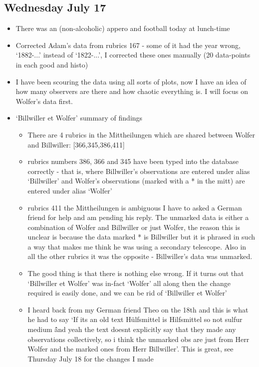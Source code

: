 \documentclass[12pt]{article}
\begin{document}
\subsection{Wednesday July 17}
\begin{itemize}
    \item There was an (non-alcoholic) appero and football today at lunch-time
    \item Corrected Adam's data from rubrics 167 - some of it had the year wrong, `1882-...' instead of `1822-...', I corrected these ones manually (20 data-points in each good and histo)
    \item I have been scouring the data using all sorts of plots, now I have an idea of how many observers are there and how chaotic everything is. I will focus on Wolfer's data first.
    \item `Billwiller et Wolfer' summary of findings
    \begin{itemize}
        \item There are 4 rubrics in the Mittheilungen which are shared between Wolfer and Billwiller: [366,345,386,411]
        \item rubrics numbers 386, 366 and 345 have been typed into the database correctly - that is, where Billwiller's observations are entered under alias `Billwiller' and Wolfer's observations (marked with a * in the mitt) are entered under alias `Wolfer'
        \item rubrics 411 the Mittheilungen is ambiguous I have to asked a German friend for help and am pending his reply. The unmarked data is either a combination of Wolfer and Billwiller or just Wolfer, the reason this is unclear is because the data marked * is Billwiller but it is phrased in such a way that makes me think he was using a secondary telescope. Also in all the other rubrics it was the opposite - Billwiller's data was unmarked.
        \item The good thing is that there is nothing else wrong. If it turns out that `Billwiller et Wolfer' was in-fact `Wolfer' all along then the change required is easily done, and we can be rid of `Billwiller et Wolfer'
        \item I heard back from my German friend Theo on the 18th and this is what he had to say `If its an old text Hülfsmittel is Hilfsmittel so not sulfur medium \^\^ and yeah the text doesnt explicitly say that they made any observations collectively, so i think the unmarked obs are just from Herr Wolfer and the marked ones from Herr Billwiller'. This is great, see Thursday July 18 for the changes I made

\end{itemize}
\end{itemize}
\end{document}
